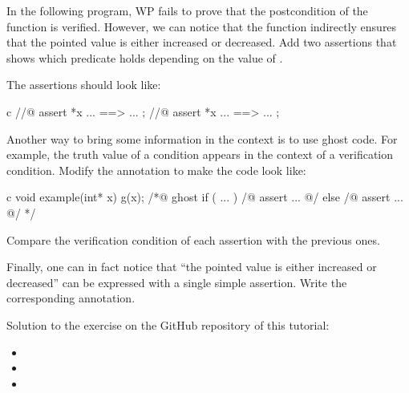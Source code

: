





In the following program, WP fails to prove that the postcondition of the
function  is verified. However, we can notice that the
 function indirectly ensures that the pointed value is either
increased or decreased. Add two assertions that shows which predicate holds
depending on the value of .




The assertions should look like:


\begin{CodeBlock}{c}
//@ assert *x ... ==> ... ;
//@ assert *x ... ==> ... ;
\end{CodeBlock}


Another way to bring some information in the context is to use ghost code.
For example, the truth value of a condition appears in the context of a
verification condition. Modify the annotation to make the code look like:


\begin{CodeBlock}{c}
void example(int* x){
  g(x);
  /*@ ghost
   if ( ... ){
    /@ assert ... @/
   } else {
    /@ assert ... @/
   }
  */
}
\end{CodeBlock}

Compare the verification condition of each assertion with the previous ones.


Finally, one can in fact notice that ``the pointed value is either increased
or decreased'' can be expressed with a single simple assertion. Write the
corresponding annotation.


\begin{Information}
  Solution to the exercise on the GitHub repository of this tutorial:
  \begin{itemize}
    \item {}
    \item {}
    \item {}
  \end{itemize}
\end{Information}


\label{l4:proof-methodologies-triggering-lemmas-exercises-sum}


